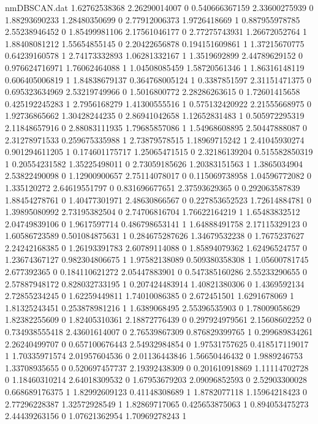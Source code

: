 \begin{filecontents}{nmDBSCAN.dat}
1.62762538368 2.26290014007 0
0.540666367159 2.33600275939 0
1.88293690233 1.28480350699 0
2.77912006373 1.9726418669 1
0.887955978785 2.55238946452 0
1.85499981106 2.17561046177 0
2.77275743931 1.26672052764 1
1.88408081212 1.55654855145 0
2.20422656878 0.194151609861 1
1.37215670775 0.64239160578 1
2.74173332893 1.06281332167 1
1.3519692899 2.44789629152 0
0.976624716971 1.76062464088 1
1.04508085459 1.58720561346 1
1.86316148119 0.606405006819 1
1.84838679137 0.364768005124 1
0.3387851597 2.31151471375 0
0.695323634969 2.53219749966 0
1.5016800772 2.28286263615 0
1.72601415658 0.425192245283 1
2.7956168279 1.41300555516 1
0.575132420922 2.21555668975 0
1.92736865662 1.30428244235 0
2.86941042658 1.12652831483 1
0.505972295319 2.11848657916 0
2.88083111935 1.79685857086 1
1.54968608895 2.50447888087 0
2.31278971533 0.259675335988 1
2.73879578515 1.18969715242 1
2.41045930274 0.901294611205 1
0.174601175717 1.25065471515 0
2.32186139204 0.515582850319 1
0.20554231582 1.35225498011 0
2.73059185626 1.20383151563 1
1.3865034904 2.53822490098 0
1.12900900657 2.75114078017 0
0.115069738958 1.04596772082 0
1.335120272 2.64619551797 0
0.831696677651 2.37593629365 0
0.292063587839 1.88454278761 0
1.40477301971 2.48630866567 0
0.227853652523 1.72614884781 0
1.39895080992 2.73195382504 0
2.74706816704 1.76622164219 1
1.65483832512 2.04749839106 0
1.9617597714 0.486798653141 1
1.64888491758 2.17115329123 0
1.60586723589 0.501084875631 1
0.284675287626 1.34679532238 0
1.7675237627 2.24242168385 0
1.26193391783 2.60789114088 0
1.85894079362 1.62496524757 0
1.23674367127 0.982304806675 1
1.97582138089 0.509380358308 1
1.05600781745 2.677392365 0
0.184110621272 2.05447883901 0
0.547385160286 2.55233290655 0
2.57887948172 0.828032733195 1
0.207424483914 1.40821380306 0
1.4369592134 2.72855234245 0
1.62259449811 1.74010086385 0
2.672451501 1.6291678069 1
1.81325243451 0.253878981216 1
1.6389068495 2.55396535903 0
1.78009058629 1.82382255609 0
1.82405310361 2.18872776439 0
0.297924979561 2.15608602252 0
0.734938555418 2.43601614007 0
2.76539867309 0.876829399765 1
0.299689834261 2.26240499707 0
0.657100676443 2.54932984854 0
1.97531757625 0.418517119017 1
1.70335971574 2.01957604536 0
2.01136443846 1.56650446432 0
1.9889246753 1.33708935655 0
0.520697457737 2.19392438309 0
0.201610918869 1.11114702728 0
1.18460310214 2.64018309532 0
1.67953679203 2.09096852593 0
2.52903300028 0.668689176375 1
1.82992609123 0.41148308689 1
1.8782077118 1.15964218423 0
2.77296228387 1.32572928549 1
1.82869717065 0.425653875063 1
0.894053475273 2.44439263156 0
1.07621362954 1.70969278243 1

\end{filecontents}
